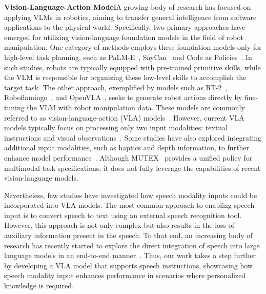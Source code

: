\textbf{Vision-Language-Action Model}\quad A growing body of research has focused on applying VLMs in robotics, aiming to transfer general intelligence from software applications to the physical world. Specifically, two primary approaches have emerged for utilizing vision-language foundation models in the field of robot manipulation. One category of methods employs these foundation models only for high-level task planning, such as PaLM-E~\citep{driess2023palmeembodiedmultimodallanguage}, SayCan~\citep{saycan2022arxiv} and Code as Policies~\citep{liang2023codepolicieslanguagemodel}. In such studies, robots are typically equipped with pre-trained primitive skills, while the VLM is responsible for organizing these low-level skills to accomplish the target task. The other approach, exemplified by models such as RT-2~\citep{brohan2023rt2visionlanguageactionmodelstransfer}, Roboflamingo~\citep{li2024visionlanguagefoundationmodelseffective}, and OpenVLA~\citep{kim2024openvlaopensourcevisionlanguageactionmodel}, seeks to generate robot actions directly by fine-tuning the VLM with robot manipulation data. These models are commonly referred to as vision-language-action (VLA) models~\citep{ding_quar-vla_2024, tong_quart-online_2024, yue2024deer, zhang2025gevrm}. However, current VLA models typically focus on processing only two input modalities: textual instructions and visual observations~\citep{belkhale_rt-h_2024}. Some studies have also explored integrating additional input modalities, such as haptics and depth information, to further enhance model performance~\citep{cai2024spatialbotprecisespatialunderstanding,zhen_3d-vla_2024}. Although MUTEX~\citep{shah_mutex_2023} provides a unified policy for multimodal task specifications, it does not fully leverage the capabilities of recent vision-language models.

Nevertheless, few studies have investigated how speech modality inputs could be incorporated into VLA models. The most common approach to enabling speech input is to convert speech to text using an external speech recognition tool. However, this approach is not only complex but also results in the loss of auxiliary information present in the speech. To that end, an increasing body of research has recently started to explore the direct integration of speech into large language models in an end-to-end manner~\citep{fu_vita_2024}. Thus, our work takes a step further by developing a VLA model that supports speech instructions, showcasing how speech modality input enhances performance in scenarios where personalized knowledge is required.